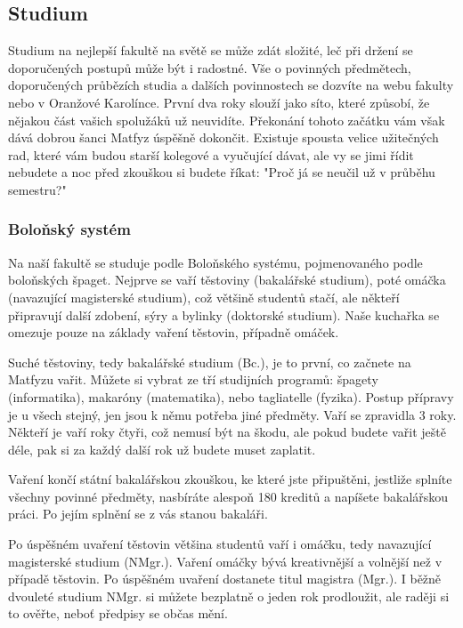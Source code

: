 \subsection{Studium}
Studium na nejlepší fakultě na světě se může zdát složité, leč při držení se doporučených postupů může být i radostné. Vše o povinných předmětech, doporučených průbězích studia a dalších povinnostech se dozvíte na webu fakulty nebo v Oranžové Karolínce. První dva roky slouží jako síto, které způsobí, že nějakou část vašich spolužáků už neuvidíte. Překonání tohoto začátku vám však dává dobrou šanci Matfyz úspěšně dokončit. Existuje spousta velice užitečných rad, které vám budou starší kolegové a vyučující dávat, ale vy se jimi řídit nebudete a noc před zkouškou si budete říkat: "Proč já se neučil už v průběhu semestru?"


\subsubsection{Boloňský systém}
Na naší fakultě se studuje podle Boloňského systému, pojmenovaného podle boloňských špaget. Nejprve se vaří těstoviny (bakalářské studium), poté omáčka (navazující magisterské studium), což většině studentů stačí, ale někteří připravují další zdobení, sýry a bylinky (doktorské studium). Naše kuchařka se omezuje pouze na základy vaření těstovin, případně omáček.

Suché těstoviny, tedy bakalářské studium (Bc.), je to první, co začnete na Matfyzu vařit. Můžete si vybrat ze tří studijních programů: špagety (informatika), makaróny (matematika), nebo tagliatelle (fyzika). Postup přípravy je u všech stejný, jen jsou k němu potřeba jiné předměty. Vaří se zpravidla 3 roky. Někteří je vaří roky čtyři, což nemusí být na škodu, ale pokud budete vařit ještě déle, pak si za každý další rok už budete muset zaplatit.

Vaření končí státní bakalářskou zkouškou, ke které jste připuštěni, jestliže splníte všechny povinné předměty, nasbíráte alespoň 180 kreditů a napíšete bakalářskou práci. Po jejím splnění se z vás stanou bakaláři.

Po úspěšném uvaření těstovin většina studentů vaří i omáčku, tedy navazující magisterské studium (NMgr.). Vaření omáčky bývá kreativnější a volnější než v případě těstovin. Po úspěšném uvaření dostanete titul magistra (Mgr.). I běžně dvouleté studium NMgr. si můžete bezplatně o jeden rok prodloužit, ale raději si to ověřte, neboť předpisy se občas mění.


